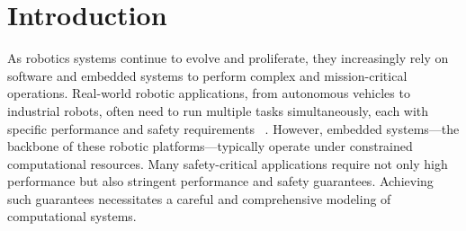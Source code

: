 
	\section{Introduction}
	
	
	
	
	
	


    
	As robotics systems continue to evolve and proliferate, they increasingly rely on software and embedded systems to perform complex and mission-critical operations. Real-world robotic applications, from autonomous vehicles to industrial robots, often need to run multiple tasks simultaneously, each with specific performance and safety requirements~\cite{Heintzman2021-mw, Percept21_RTSS, Ash23RAL} . However, embedded systems—the backbone of these robotic platforms—typically operate under constrained computational resources. Many safety-critical applications require not only high performance but also stringent performance and safety guarantees. Achieving such guarantees necessitates a careful and comprehensive modeling of computational systems.
	

